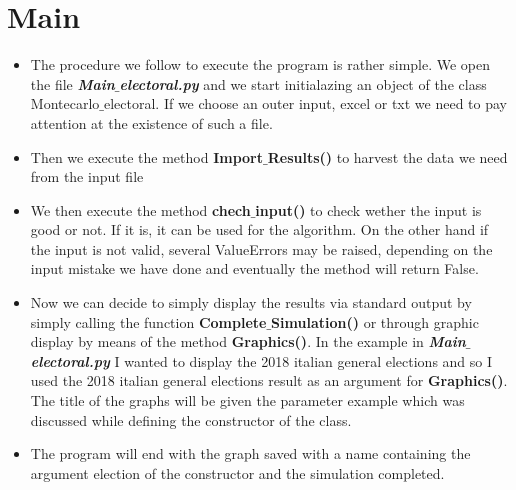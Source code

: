\documentclass[12pt,a4paper,openright]{report}
\begin{document}
\section*{Main}
\begin{itemize}
\item
The procedure we follow to execute the program is rather simple. We open the file  \textit{\textbf{Main$\_$electoral.py}} and we start initialazing an object of the class Montecarlo$\_$electoral. If we choose an outer input, excel or txt we need to pay attention at the existence of such a file.
\item
Then we execute the method \textbf{Import$\_$Results()} to harvest the data we need from the input file
\item
We then execute the method \textbf{chech$\_$input()} to check wether the input is good or not. If it is, it can be used for the algorithm. On the other hand if the input is not valid, several ValueErrors may be raised, depending on the input mistake we have done and eventually the method will return False.
\item
Now we can decide to simply display the results via standard output by simply calling the function \textbf{Complete$\_$Simulation()} or through graphic display by means of the method \textbf{Graphics()}. In the example in \textit{\textbf{Main$\_$electoral.py}} I wanted to display the 2018 italian general elections and so I used the 2018 italian general elections result as an argument for \textbf{Graphics()}. The title of the graphs will be given the parameter example which was discussed while defining the constructor of the class.
\item
The program will end with the graph saved with a name containing the argument election of the constructor and the simulation completed.

\end{itemize}
\end{document}
